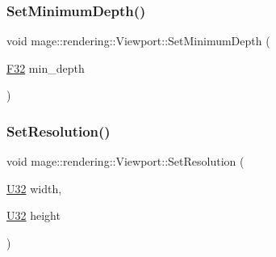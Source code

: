 \hypertarget{classmage_1_1rendering_1_1_viewport_a5148b28315b8426ba5d26a8c76b39cad}{}\label{classmage_1_1rendering_1_1_viewport_a5148b28315b8426ba5d26a8c76b39cad} 
\subsubsection{\texorpdfstring{Set\+Minimum\+Depth()}{SetMinimumDepth()}}
{\footnotesize\ttfamily void mage\+::rendering\+::\+Viewport\+::\+Set\+Minimum\+Depth (\begin{DoxyParamCaption}\item[{\hyperlink{namespacemage_aa97e833b45f06d60a0a9c4fc22ae02c0}{F32}}]{min\+\_\+depth }\end{DoxyParamCaption})\hspace{0.3cm}{\ttfamily [noexcept]}}

\hypertarget{classmage_1_1rendering_1_1_viewport_a47894b9c1fb70c81a1b881fa807b89eb}{}\label{classmage_1_1rendering_1_1_viewport_a47894b9c1fb70c81a1b881fa807b89eb} 
\subsubsection{\texorpdfstring{Set\+Resolution()}{SetResolution()}\hspace{0.1cm}{\footnotesize\ttfamily [1/2]}}
{\footnotesize\ttfamily void mage\+::rendering\+::\+Viewport\+::\+Set\+Resolution (\begin{DoxyParamCaption}\item[{\hyperlink{namespacemage_a41c104c036fba3756a74e19f793eeaa1}{U32}}]{width,  }\item[{\hyperlink{namespacemage_a41c104c036fba3756a74e19f793eeaa1}{U32}}]{height }\end{DoxyParamCaption})\hspace{0.3cm}{\ttfamily [noexcept]}}

\hypertarget{classmage_1_1rendering_1_1_viewport_ada6ffe820ed4dec4ff0dbee2fb43e4e8}{}\label{classmage_1_1rendering_1_1_viewport_ada6ffe820ed4dec4ff0dbee2fb43e4e8} 
